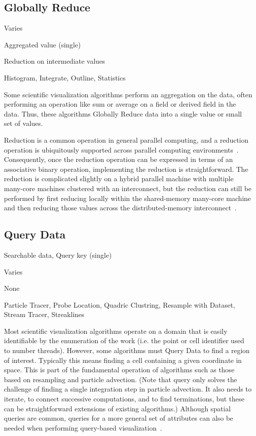 \documentclass{sig-alternate}
\newcommand*{\lcite}[1]{~\cite{#1}}
\newcommand{\algclass}[1]{\textsf{#1}}
\newcommand{\algorithmclasssection}[1]{\subsection*{#1}}
\newcommand{\algorithmclass}[5]{
  \algorithmclasssection{#1} %
  \begin{description}[leftmargin=9em,style=nextline,noitemsep]
    \raggedright
  \item[Input] #2
  \item[Output] #3
  \item[Interdependence] #4
  \item[Algorithms] #5
  \end{description}
}
\begin{document}
\algorithmclass{Globally Reduce}
               {Varies} %
               {Aggregated value (single)} %
               {Reduction on intermediate values} %
               {
                 Histogram,
                 Integrate,
                 Outline,
                 Statistics
               }

\noindent
Some scientific visualization algorithms perform an aggregation on the
data, often performing an operation like sum or average on a field or
derived field in the data. Thus, these algorithms \algclass{Globally
  Reduce} data into a single value or small set of values.

Reduction is a common operation in general parallel computing, and a
reduction operation is ubiquitously supported across parallel computing
environments\lcite{MPI,Sanders2011,Thrust,TBB,Quinn2004}. Consequently,
once the reduction operation can be expressed in terms of an associative
binary operation, implementing the reduction is straightforward. The
reduction is complicated slightly on a hybrid parallel machine with
multiple many-core machines clustered with an interconnect, but the
reduction can still be performed by first reducing locally within the
shared-memory many-core machine and then reducing those values across the
distributed-memory interconnect\lcite{Dinan2010}.


\algorithmclass{Query Data}
               {Searchable data, Query key (single)} %
               {Varies} %
               {None} %
               {
                 Particle Tracer,
                 Probe Location,
                 Quadric Clustring,
                 Resample with Dataset,
                 Stream Tracer,
                 Streaklines
               }

\noindent
Most scientific visualization algorithms operate on a domain that is easily
identifiable by the enumeration of the work (i.e. the point or cell
identifier used to number threads). However, some algorithms must
\algclass{Query Data} to find a region of interest. Typically this means
finding a cell containing a given coordinate in space. This is part of the
fundamental operation of algorithms such as those based on resampling and
particle advection. (Note that query only solves the challenge of finding a
single integration step in particle advection. It also needs to iterate, to
connect successive computations, and to find terminations, but these can be
straightforward extensions of existing algorithms.) Although spatial
queries are common, queries for a more general set of attributes can also
be needed when performing query-based
visualization\lcite{Glatter2008,Gosink2008,Johnson2009,Rubel2008}.
\end{document}
